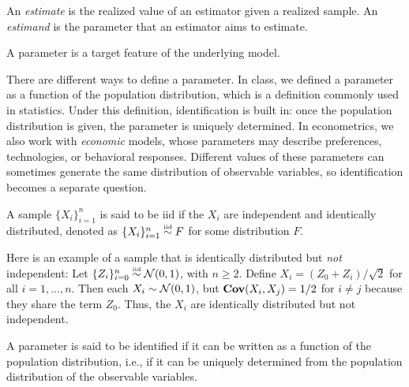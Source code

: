 \documentclass[a4paper,12pt]{article}
\begin{document}

\begin{remark}
	An \emph{estimate} is the realized value of an estimator given a realized sample.
	An \emph{estimand} is the parameter that an estimator aims to estimate.
\end{remark}

\begin{definition}[Parameter]\label{def-parameter}
	A parameter is a target feature of the underlying model.
\end{definition}

\begin{remark}
	There are different ways to define a parameter.
	In class, we defined a parameter as a function of the population distribution,
	which is a definition commonly used in statistics.
	Under this definition, identification is built in:
	once the population distribution is given, the parameter is uniquely determined.
	In econometrics, we also work with \emph{economic} models,
	whose parameters may describe preferences, technologies, or behavioral responses.
	Different values of these parameters can sometimes generate the same distribution of observable variables,
	so identification becomes a separate question.
\end{remark}

\begin{definition}\label{def-iid}
	A sample $\{X_i\}_{i=1}^{n}$ is said to be \gls{iid} if the $X_i$ are independent and identically distributed,
	denoted as $\{X_i\}_{i=1}^n\overset{\text{\tiny iid}}{\sim} F$ for some distribution $F$.
\end{definition}

\begin{remark}
	Here is an example of a sample that is identically distributed but \emph{not} independent:
	Let $\{Z_i\}_{i=0}^n\overset{\text{\tiny iid}}{\sim}\operatorname{\mathcal{N}}(0,1)$, with $n\geq2$.
	Define $X_i = (Z_0 + Z_i)/\sqrt{2}$ for all $i=1,...,n$.
	Then each $X_i\sim\operatorname{\mathcal{N}}(0,1)$,
	but $\operatorname{\text{\textrm{\upshape\textbf{Cov}}}}(X_i,X_j)=1/2$ for $i\ne j$ because they share the term $Z_0$.
	Thus, the $X_i$ are identically distributed but not independent.
\end{remark}

\begin{definition}[Identification]\label{def-identification}
	A parameter is said to be identified if it can be written as a function of the population distribution,
	i.e., if it can be uniquely determined from the population distribution of the observable variables.
\end{definition}
\end{document}
